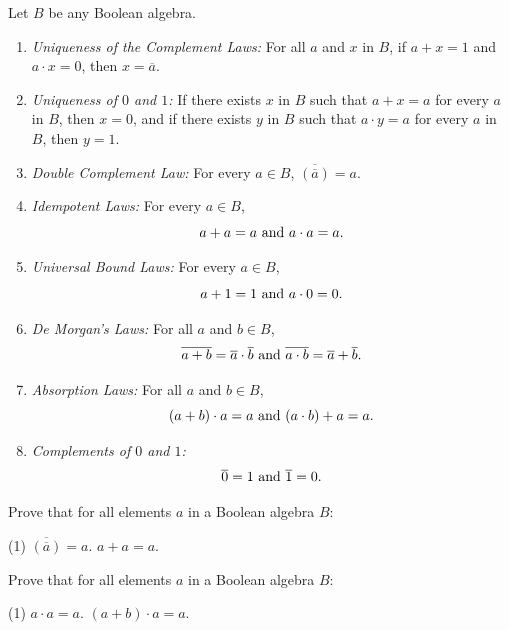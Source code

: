 \documentclass[../mathNotesPreamble]{subfiles}
\begin{document}
  \begin{thmBox*}
    Let $B$ be any Boolean algebra.
    \begin{enumerate}
      \item \textit{Uniqueness of the Complement Laws:} For all $a$ and $x$ in $B$, if $a+x=1$ and $a\cdot x=0$, then $x=\overline{a}$.
      \item \textit{Uniqueness of $0$ and $1$:} If there exists $x$ in $B$ such that $a+x=a$ for every $a$ in $B$, then $x=0$, and if there exists $y$ in $B$ such that $a\cdot y=a$ for every $a$ in $B$, then $y=1$.
      \item \textit{Double Complement Law:} For every $a\in B$, $\overline{(\overline{a})}=a$.
      \item \textit{Idempotent Laws:} For every $a\in B$,
        \[a+a=a \textnormal{ and } a\cdot a=a.\]
      \item \textit{Universal Bound Laws:} For every $a\in B$,
        \[a+1=1 \textnormal{ and } a\cdot 0=0.\]
      \item \textit{De Morgan's Laws:} For all $a$ and $b\in B$,
        \[\overline{a+b}=\overline{a}\cdot\overline{b} \textnormal{ and }\overline{a\cdot b}=\overline{a}+\overline{b}.\]
      \item \textit{Absorption Laws:} For all $a$ and $b\in B$,
        \[(a+b)\cdot a=a \textnormal{ and } (a\cdot b)+a=a.\]
      \item \textit{Complements of $0$ and $1$:}
        \[\overline{0}=1 \textnormal{ and } \overline{1}=0.\]
    \end{enumerate}
  \end{thmBox*}
  \pagebreak

  \begin{ex*}
    Prove that for all elements $a$ in a Boolean algebra $B$:
    \begin{extasks}[after-item-skip=\stretch{1}](1)
      \task $\overline{(\overline{a})}=a$.
      \task $a+a=a$.
    \end{extasks}
  \end{ex*}
  \pagebreak

  \begin{ex*}
    Prove that for all elements $a$ in a Boolean algebra $B$:
    \begin{extasks}[after-item-skip=\stretch{1}](1)
      \task $a\cdot a=a$.
      \task $(a+b)\cdot a=a$.
    \end{extasks}
  \end{ex*}
  \pagebreak
\end{document}
